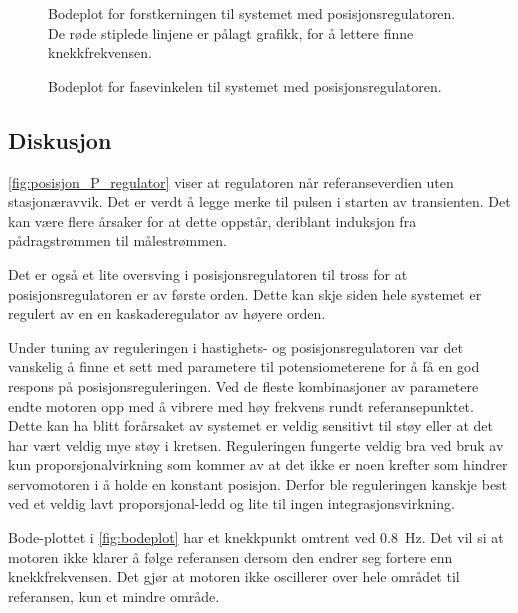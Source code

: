 \begin{figure}[h!]
    \centering
    
    \caption{Bodeplot for forstkerningen til systemet med posisjonsregulatoren. De røde stiplede linjene er pålagt grafikk, for å lettere finne knekkfrekvensen.}
    \label{fig:bodeplot}
\end{figure}

\begin{figure}[h!]
    \centering
    
    \caption{Bodeplot for fasevinkelen til systemet med posisjonsregulatoren.}
    \label{fig:bodeplot_fase}
\end{figure}

\FloatBarrier




\subsection{Diskusjon}

\autoref{fig:posisjon_P_regulator} viser at regulatoren når referanseverdien uten stasjonæravvik. Det er verdt å legge merke til pulsen i starten av transienten. 
Det kan være flere årsaker for at dette oppstår, deriblant induksjon fra pådragstrømmen til målestrømmen.

Det er også et lite oversving i posisjonsregulatoren til tross for at posisjonsregulatoren er av første orden. Dette kan skje siden hele systemet er regulert av en en kaskaderegulator av høyere orden.

Under tuning av reguleringen i hastighets- og posisjonsregulatoren var det vanskelig å finne et sett med parametere til potensiometerene for å få en god respons på posisjonsreguleringen. 
Ved de fleste kombinasjoner av parametere endte motoren opp med å vibrere med høy frekvens rundt referansepunktet. 
Dette kan ha blitt forårsaket av systemet er veldig sensitivt til støy eller at det har vært veldig mye støy i kretsen.
Reguleringen fungerte veldig bra ved bruk av kun proporsjonalvirkning som kommer av at det ikke er noen krefter som hindrer servomotoren i å holde en konstant posisjon.
Derfor ble reguleringen kanskje best ved et veldig lavt proporsjonal-ledd og lite til ingen integrasjonsvirkning.


Bode-plottet i \autoref{fig:bodeplot} har et knekkpunkt omtrent ved \SI{0.8}{\hertz}. Det vil si at motoren ikke klarer å følge referansen dersom den endrer seg fortere enn knekkfrekvensen. Det gjør at motoren ikke oscillerer over hele området til referansen, kun et mindre område. 

